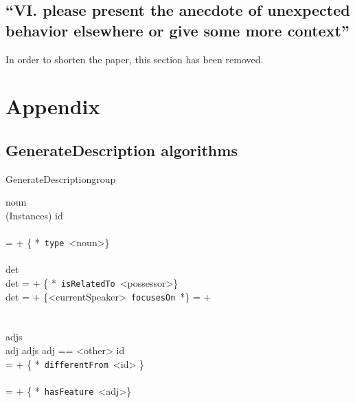 \documentclass[11pt]{article}
\begin{document}
\subsection{``VI. please present the anecdote of unexpected behavior elsewhere
or give some more context''}

In order to shorten the paper, this section has been removed.

\section{Appendix}

\subsection{GenerateDescription algorithms}
\label{GenerateDescription}
\begin{pseudocode}[ruled]{GenerateDescription}{group}
\label{algo|GenerateDescription}

   noun \GETS {} \\ 
   \IF {} \in (Instances) \THEN
   		\BEGIN
		id \GETS {}\\	
		\\
		\END
   \ELSE
    	 =  + \{ *\ {\tt type}\ <noun>\} \\
   
   \\
   det \GETS {} \\
   \IF det  \THEN
        =  + \{ *\ {\tt isRelatedTo}\ <possessor>\} \\
    
    \IF det  \THEN
        \BEGIN
        \IF {} \THEN 
             =  + \{<currentSpeaker>\ {\tt focusesOn}\ *\}
        \ELSE
             =  +  \\
        \END \\
   \\
   adjs \GETS {} \\
   \FOREACH adj \in adjs \DO
   	\BEGIN
   		\IF adj == <other> \THEN 
   			\BEGIN
   			id \GETS {} \\
   			 =  + \{ *\ {\tt differentFrom}\ <id> \}\\
   			\\
			\END   		
   		\ELSE
	     	 =  + \{ *\ {\tt hasFeature}\ <adj>\} \\
    \END\\
    

\end{pseudocode}
\end{document}
